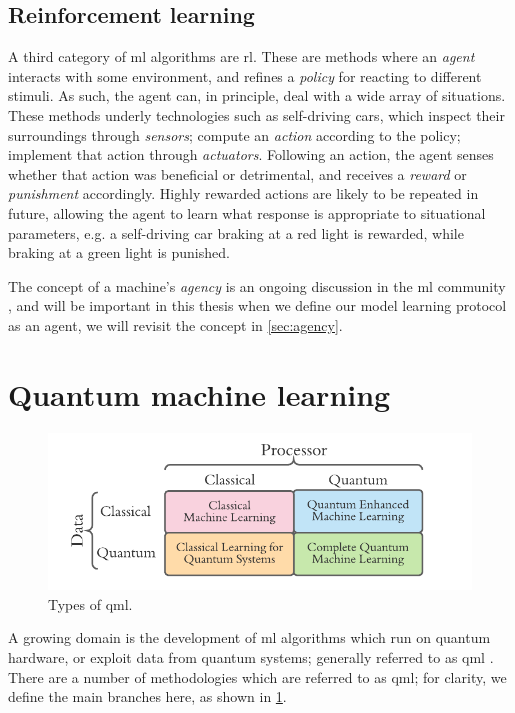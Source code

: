 \subsection{Reinforcement learning}
A third category of \gls{ml} algorithms are \acrfull{rl}. 
These are methods where an \emph{agent} interacts with some environment, 
    and refines a \emph{policy} for reacting to different stimuli. 
As such, the agent can, in principle, deal with a wide array of situations. 
These methods underly technologies such as self-driving cars, 
    which inspect their surroundings through \emph{sensors};
    compute an \emph{action} according to the policy; 
    implement that action through \emph{actuators}.
Following an action, the agent senses whether that action was beneficial or detrimental, 
    and receives a \emph{reward} or \emph{punishment} accordingly. 
Highly rewarded actions are likely to be repeated in future, allowing the agent to learn what response is 
    appropriate to situational parameters, 
    e.g. a self-driving car braking at a red light is rewarded, 
    while braking at a green light is punished. 
\par 
The concept of a machine's \emph{agency} is an ongoing discussion in the \gls{ml} community \cite{franklin1996agent, wooldridge2009introduction}, 
    and will be important in this thesis when we define our model learning protocol as an agent, 
    we will revisit the concept in \cref{sec:agency}.

\section{Quantum machine learning}\label{sec:quantum_machine_learning}
\begin{figure}
    \begin{center}
        \includegraphics{contextual_review/figures/qml_types.pdf}
    \end{center}
    \caption[Types of quantum machine learning]{Types of \acrlong{qml}.}
    \label{fig:qml_types}
\end{figure}
A growing domain is the development of \gls{ml} algorithms which run on quantum hardware, 
    or exploit data from quantum systems; generally referred to as \acrfull{qml} \cite{biamonte2017quantum, adcock2015advances}. 
There are a number of methodologies which are referred to as \gls{qml};
    for clarity, we define the main branches here, as shown in \cref{fig:qml_types}. 

